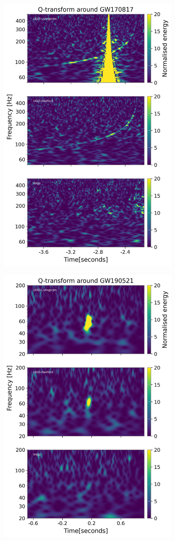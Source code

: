 \begin{figure}[htb]
    \centering
    \begin{subfigure}{0.45\textwidth}
       \centering
       \includegraphics[width=0.65\linewidth]{GWanalysisProject_codefile/qtransformplot/GW170817_qtransform.png}
       \label{fig: gw170817qtransform}
    \end{subfigure}
    \hfill
    \begin{subfigure}{0.45\textwidth}
        \centering
        \includegraphics[width=0.65\linewidth]{GWanalysisProject_codefile/qtransformplot/GW190521_qtransform.png}

\end{subfigure}
\end{figure}
